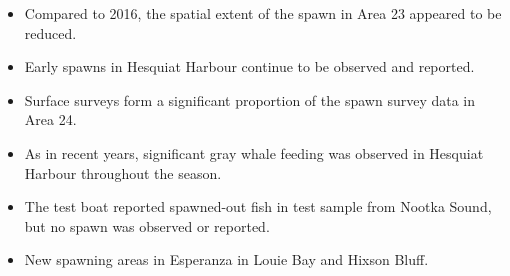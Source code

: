 \begin{itemize}
\item Compared to 2016, the spatial extent of the spawn in Area 23 appeared to be reduced.
\item Early spawns in Hesquiat Harbour continue to be observed and reported.
\item Surface surveys form a significant proportion of the spawn survey data in Area 24.
\item As in recent years, significant gray whale feeding was observed in Hesquiat Harbour throughout the season.
\item The test boat reported spawned-out fish in test sample from Nootka Sound, but no spawn was observed or reported.
\item New spawning areas in Esperanza in Louie Bay and Hixson Bluff.
\end{itemize}